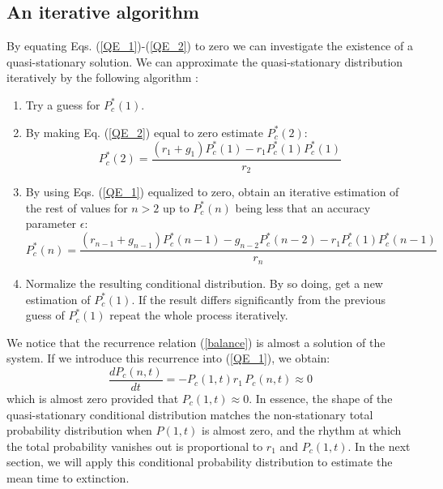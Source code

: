\subsection{An iterative algorithm}
By equating Eqs. (\ref{QE_1})-(\ref{QE_2}) to zero we can investigate the existence of a quasi-stationary solution. We can approximate the quasi-stationary distribution iteratively by the following algorithm \cite{Nisbet82}:
\begin{enumerate}
\item Try a guess for $P^*_c(1)$.
\item By making Eq. (\ref{QE_2}) equal to zero estimate $P^*_c(2)$:
  \begin{equation}
    P^*_c(2) = \frac{(r_1+g_1)P^*_c(1) - r_1 P^*_c(1) P^*_c(1)}{r_2}
  \end{equation}
\item By using Eqs. (\ref{QE_1}) equalized to zero, obtain an iterative estimation of the 
rest of values for $n>2$ up to $P^*_c(n)$ being less that an accuracy parameter $\epsilon$:
  \begin{equation}
    P^*_c(n) = \frac{(r_{n-1}+g_{n-1})P^*_c(n-1) - g_{n-2} P^*_c(n-2) - r_1 P^*_c(1) P^*_c(n-1)}{r_n}
  \end{equation}
\item Normalize the resulting conditional distribution. By so doing, get a new estimation 
of $P^*_c(1)$. If the result differs significantly from the previous guess of $P^*_c(1)$ 
repeat the whole process iteratively.
\end{enumerate}

We notice that the recurrence relation (\ref{balance}) is almost a solution of the system. If we introduce this recurrence into (\ref{QE_1}), we obtain:
\begin{equation}
  \label{QE_3}
  \frac{dP_c(n,t)}{dt} =  - P_c(1,t)r_1\,P_c(n,t) \approx 0
\end{equation}
which is almost zero provided that $P_c(1,t) \approx 0$. In essence, the shape of the quasi-stationary conditional distribution matches the non-stationary total probability distribution when $P(1,t)$ is almost zero, and the rhythm at which the total probability vanishes out is proportional to $r_1$ and $P_c(1,t)$. In the next section, we will apply this conditional probability distribution to estimate the mean time to extinction.

